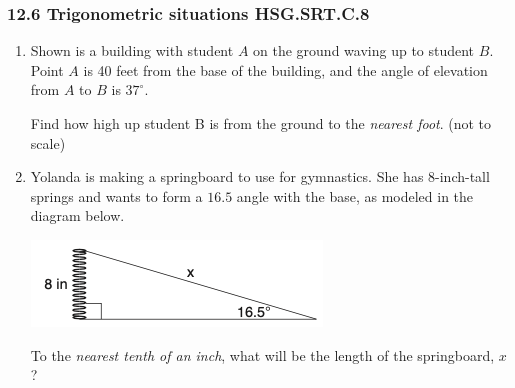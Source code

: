 

\fancyhead[LE]{\thepage}



\subsubsection*{12.6 Trigonometric situations \hfill HSG.SRT.C.8}
\begin{enumerate}
\item Shown is a building with student $A$ on the ground waving up to student $B$. Point $A$ is 40 feet from the base of the building, and the angle of elevation from $A$ to $B$ is $37^\circ$.

Find how high up student B is from the ground to the \emph{nearest foot}. \hfill (not to scale)
  \begin{flushright}
    \end{flushright}

\item Yolanda is making a springboard to use for gymnastics. She has 8-inch-tall springs and wants to form a $16.5$ angle with the base, as modeled in the diagram below.
\begin{center}
  \includegraphics[scale=0.6]{../graphics/trig-spring.png}
\end{center}
To the \emph{nearest tenth of an inch}, what will be the length of the springboard, $x$? \vspace{4cm}


\end{enumerate}
